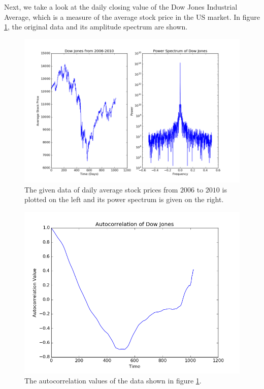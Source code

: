 \documentclass[11pt, letterpage, twocolumn]{article}
\begin{document}
Next, we take a look at the daily closing value of the Dow Jones Industrial Average, which is a measure of the average stock price in the US market. In figure \ref{fig:dow}, the original data and its amplitude spectrum are shown.

\begin{figure}
  \includegraphics[width=\linewidth]{dow.png}
  \caption{
    The given data of daily average stock prices from $2006$ to $2010$ is plotted on the left and its power spectrum is given on the right.
  }
  \label{fig:dow}
\end{figure}

\begin{figure}
  \includegraphics[width=\linewidth]{dow_ac.png}
  \caption{
    The autocorrelation values of the data shown in figure \ref{fig:dow}.
  }
  \label{fig:dow_ac}
\end{figure}
\end{document}
